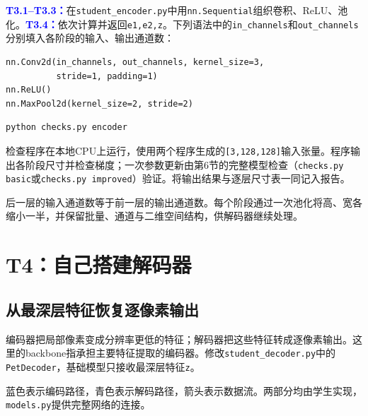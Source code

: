 \documentclass[UTF8,a4paper,11pt,fontset=fandol]{ctexart}
\newcommand{\file}[1]{\nolinkurl{#1}}
\newcommand{\shape}[1]{\texttt{#1}}
\newcommand{\task}[1]{\textcolor{Blue}{\textbf{#1}}}
\begin{document}
\task{T3.1--T3.3：}在\file{student_encoder.py}中用\file{nn.Sequential}组织卷积、ReLU、池化。\task{T3.4：}依次计算并返回\file{e1,e2,z}。下列语法中的\file{in_channels}和\file{out_channels}分别填入各阶段的输入、输出通道数：
\begin{lstlisting}
nn.Conv2d(in_channels, out_channels, kernel_size=3,
          stride=1, padding=1)
nn.ReLU()
nn.MaxPool2d(kernel_size=2, stride=2)
\end{lstlisting}
\begin{lstlisting}[language=bash]
python checks.py encoder
\end{lstlisting}
检查程序在本地CPU上运行，使用两个程序生成的\shape{[3,128,128]}输入张量。程序输出各阶段尺寸并检查梯度；一次参数更新由第6节的完整模型检查（\texttt{checks.py basic}或\texttt{checks.py improved}）验证。将输出结果与逐层尺寸表一同记入报告。
\begin{keybox}[层间连接关系]
后一层的输入通道数等于前一层的输出通道数。每个阶段通过一次池化将高、宽各缩小一半，并保留批量、通道与二维空间结构，供解码器继续处理。
\end{keybox}
\clearpage

\section{T4：自己搭建解码器}
\subsection{从最深层特征恢复逐像素输出}
编码器把局部像素变成分辨率更低的特征；解码器把这些特征转成逐像素输出。这里的backbone指承担主要特征提取的编码器。修改\file{student_decoder.py}中的\file{PetDecoder}，基础模型只接收最深层特征\file{z}。
\begin{center}
\end{center}
蓝色表示编码路径，青色表示解码路径，箭头表示数据流。两部分均由学生实现，\file{models.py}提供完整网络的连接。
\end{document}
